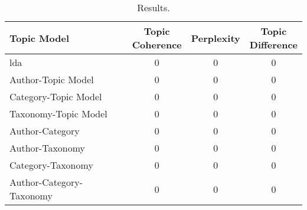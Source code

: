 \begin{table}[h]
	\centering
	\caption{Results.}
	\begin{tabular}{l|c|c|c}
		Topic Model & \makecell{Topic \\ Coherence} & Perplexity & \makecell{Topic \\ Difference} \\
		\midrule
		\Acrlong{lda} & 0 & 0 & 0 \\
		Author-Topic Model & 0 & 0 & 0 \\
		Category-Topic Model & 0 & 0 & 0 \\
		Taxonomy-Topic Model & 0 & 0 & 0 \\
		Author-Category & 0 & 0 & 0 \\
		Author-Taxonomy & 0 & 0 & 0 \\
		Category-Taxonomy & 0 & 0 & 0 \\
		Author-Category-Taxonomy & 0 & 0 & 0 \\
	\end{tabular}
	\label{tab:metric_results}
\end{table}